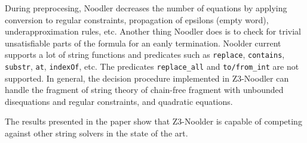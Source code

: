 \documentclass{article}
\begin{document}
During preprocesing, Noodler decreases the number of equations by applying conversion to regular constraints, propagation of epsilons (empty word), underapproximation rules, etc.
Another thing Noodler does is to check for trivial unsatisfiable parts of the formula for an eanly termination. Noolder current supports a lot of
string functions and predicates such as \texttt{replace}, \texttt{contains}, \texttt{substr}, \texttt{at}, \texttt{indexOf}, etc. The predicates \texttt{replace\_all} and
\texttt{to/from\_int} are not supported. In general, the decision procedure implemented in Z3-Noodler can handle the fragment of string theory of chain-free fragment with unbounded
disequations and regular constraints, and quadratic equations. 

The results presented in the paper show that Z3-Noolder is capable of competing against other string solvers in the state of the art.
\end{document}
